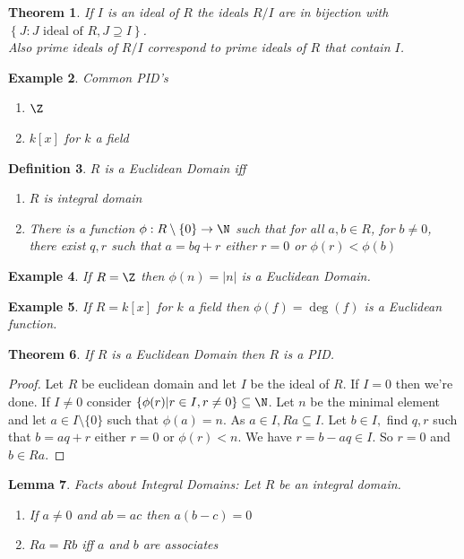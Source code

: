 \documentclass[a4paper,12pt]{article}
\newtheorem{thm}{Theorem}[section]
\newtheorem{lem}[thm]{Lemma}
\newtheorem{defn}[thm]{Definition}
\newtheorem{eg}[thm]{Example}
\begin{document}
\begin{thm}
    If $I$ is an ideal of $R$ the ideals $R/I$ are in bijection with $ \left\{J: J \text{ ideal of } R, J\supseteq I \right\}$.\\
    Also prime ideals of $R/I$ correspond to prime ideals of $R$ that contain $I$. 
\end{thm}
\begin{eg}
    Common PID's
    \begin{enumerate}
        \item $\Z$
        \item $k[x]$ for $k$ a field
    \end{enumerate}
\end{eg}
\begin{defn}
    $R$ is a Euclidean Domain iff 
    \begin{enumerate}
        \item $R$ is integral domain 
        \item There is a function $\phi:R\setminus \{0\}\to \N$ such that for all $a,b\in R$, for $b\neq 0$, there exist $q,r$ such that $a=bq+r$ either $r=0$ or $\phi(r)<\phi(b)$
    \end{enumerate}
\end{defn}
\begin{eg}
    If $R=\Z$ then $\phi(n)=|n|$ is a Euclidean Domain.
\end{eg}
\begin{eg}
    If $R=k[x]$ for $k$ a field then $\phi(f)=\deg(f)$ is a Euclidean function. 
\end{eg}
\begin{thm}
    If $R$ is a Euclidean Domain then $R$ is a PID.
\end{thm}
\begin{proof}
    Let $R$ be euclidean domain and let $I$ be the ideal of $R$. If $I=0$ then we're done. If $I\neq 0$ consider $ \left\{\phi(r)|r\in I, r\neq 0\right\}\subseteq \N$. Let $n$ be the minimal element and let $a\in I\setminus \{0\}$ such that $\phi(a)=n$. As $a\in I, Ra\subseteq I$. Let $b\in I,$ find $q,r$ such that $b=aq+r$ either $r=0$ or $\phi(r)<n$. We have $r=b-aq\in I$. So $r=0$ and $b\in Ra$. 
\end{proof}
\begin{lem}
    Facts about Integral Domains: Let $R$ be an integral domain. 
    \begin{enumerate}
       \item If $a\neq 0$ and $ab=ac$ then $a(b-c)=0$
       \item $Ra=Rb$ iff $a$ and $b$ are associates   
    \end{enumerate}
\end{lem}
\end{document}

